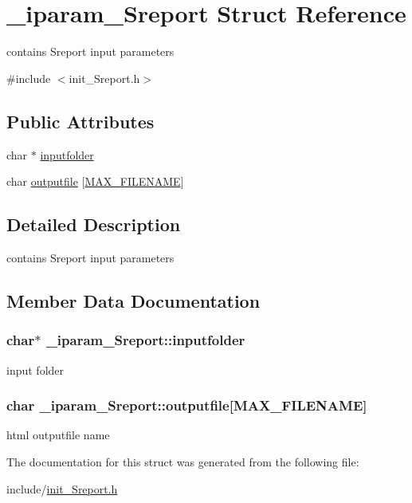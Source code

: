 \hypertarget{struct__iparam__Sreport}{\section{\+\_\+iparam\+\_\+\+Sreport Struct Reference}
\label{struct__iparam__Sreport}
}


contains Sreport input parameters  




{\ttfamily \#include $<$init\+\_\+\+Sreport.\+h$>$}

\subsection*{Public Attributes}
\begin{DoxyCompactItemize}
\item 
char $\ast$ \hyperlink{struct__iparam__Sreport_af5521a185f440566547b4b11b9fac6a4}{inputfolder}
\item 
char \hyperlink{struct__iparam__Sreport_aab71d9b5647daf65a8ba9ba6f7a35ee5}{outputfile} \mbox{[}\hyperlink{defines_8h_abe0ec333b60117063f9b9fd9f849cb08}{M\+A\+X\+\_\+\+F\+I\+L\+E\+N\+A\+M\+E}\mbox{]}
\end{DoxyCompactItemize}


\subsection{Detailed Description}
contains Sreport input parameters 

\subsection{Member Data Documentation}
\hypertarget{struct__iparam__Sreport_af5521a185f440566547b4b11b9fac6a4}{
\subsubsection[{inputfolder}]{\setlength{\rightskip}{0pt plus 5cm}char$\ast$ \+\_\+iparam\+\_\+\+Sreport\+::inputfolder}}\label{struct__iparam__Sreport_af5521a185f440566547b4b11b9fac6a4}
input folder \hypertarget{struct__iparam__Sreport_aab71d9b5647daf65a8ba9ba6f7a35ee5}{
\subsubsection[{outputfile}]{\setlength{\rightskip}{0pt plus 5cm}char \+\_\+iparam\+\_\+\+Sreport\+::outputfile\mbox{[}{\bf M\+A\+X\+\_\+\+F\+I\+L\+E\+N\+A\+M\+E}\mbox{]}}}\label{struct__iparam__Sreport_aab71d9b5647daf65a8ba9ba6f7a35ee5}
html outputfile name 

The documentation for this struct was generated from the following file\+:\begin{DoxyCompactItemize}
\item 
include/\hyperlink{init__Sreport_8h}{init\+\_\+\+Sreport.\+h}\end{DoxyCompactItemize}
